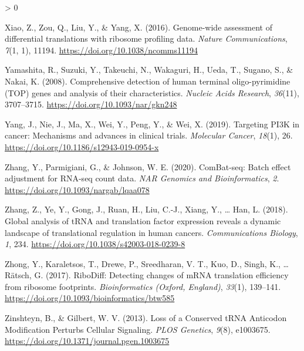 \documentclass[
  12pt,
  openany]{book}
\newlength{\cslhangindent}
\newenvironment{CSLReferences}[2] %
 {%
  \setlength{\parindent}{0pt}
  \ifodd #1 \everypar{\setlength{\hangindent}{\cslhangindent}}\ignorespaces\fi
  \ifnum #2 > 0
  \setlength{\parskip}{#2\baselineskip}
  \fi
 }%
 {}
\begin{document}
\begin{CSLReferences}{1}{0}
\leavevmode\hypertarget{ref-Xiao2016a}{}%
Xiao, Z., Zou, Q., Liu, Y., \& Yang, X. (2016). Genome-wide assessment of differential translations with ribosome profiling data. \emph{Nature Communications}, \emph{7}(1, 1), 11194. \url{https://doi.org/10.1038/ncomms11194}

\leavevmode\hypertarget{ref-Yamashita2008}{}%
Yamashita, R., Suzuki, Y., Takeuchi, N., Wakaguri, H., Ueda, T., Sugano, S., \& Nakai, K. (2008). Comprehensive detection of human terminal oligo-pyrimidine ({TOP}) genes and analysis of their characteristics. \emph{Nucleic Acids Research}, \emph{36}(11), 3707--3715. \url{https://doi.org/10.1093/nar/gkn248}

\leavevmode\hypertarget{ref-Yang2019}{}%
Yang, J., Nie, J., Ma, X., Wei, Y., Peng, Y., \& Wei, X. (2019). Targeting {PI3K} in cancer: Mechanisms and advances in clinical trials. \emph{Molecular Cancer}, \emph{18}(1), 26. \url{https://doi.org/10.1186/s12943-019-0954-x}

\leavevmode\hypertarget{ref-Zhang2020}{}%
Zhang, Y., Parmigiani, G., \& Johnson, W. E. (2020). {ComBat}-seq: Batch effect adjustment for {RNA}-seq count data. \emph{NAR Genomics and Bioinformatics}, \emph{2}. \url{https://doi.org/10.1093/nargab/lqaa078}

\leavevmode\hypertarget{ref-Zhang2018}{}%
Zhang, Z., Ye, Y., Gong, J., Ruan, H., Liu, C.-J., Xiang, Y., \ldots{} Han, L. (2018). Global analysis of {tRNA} and translation factor expression reveals a dynamic landscape of translational regulation in human cancers. \emph{Communications Biology}, \emph{1}, 234. \url{https://doi.org/10.1038/s42003-018-0239-8}

\leavevmode\hypertarget{ref-Zhong2017}{}%
Zhong, Y., Karaletsos, T., Drewe, P., Sreedharan, V. T., Kuo, D., Singh, K., \ldots{} Rätsch, G. (2017). {RiboDiff}: Detecting changes of {mRNA} translation efficiency from ribosome footprints. \emph{Bioinformatics (Oxford, England)}, \emph{33}(1), 139--141. \url{https://doi.org/10.1093/bioinformatics/btw585}

\leavevmode\hypertarget{ref-Zinshteyn2013}{}%
Zinshteyn, B., \& Gilbert, W. V. (2013). Loss of a {Conserved tRNA Anticodon Modification Perturbs Cellular Signaling}. \emph{PLOS Genetics}, \emph{9}(8), e1003675. \url{https://doi.org/10.1371/journal.pgen.1003675}

\end{CSLReferences}
\end{document}
